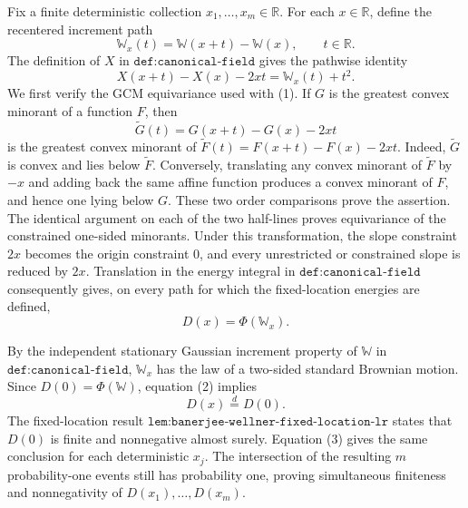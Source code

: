 Fix a finite deterministic collection \(x_1,\ldots,x_m\in\mathbb R\).  For each \(x\in\mathbb R\), define the recentered increment path
\[
 \mathbb W_x(t)=\mathbb W(x+t)-\mathbb W(x),\qquad t\in\mathbb R.
\]
The definition of \(X\) in \(\texttt{def:canonical-field}\) gives the pathwise identity
\[
 X(x+t)-X(x)-2xt=\mathbb W_x(t)+t^2. \tag{1}
\]
We first verify the GCM equivariance used with (1).  If \(G\) is the greatest convex minorant of a function \(F\), then
\[
 \widetilde G(t)=G(x+t)-G(x)-2xt
\]
is the greatest convex minorant of
\(
 \widetilde F(t)=F(x+t)-F(x)-2xt
\).
Indeed, \(\widetilde G\) is convex and lies below \(\widetilde F\).  Conversely, translating any convex minorant of \(\widetilde F\) by \(-x\) and adding back the same affine function produces a convex minorant of \(F\), and hence one lying below \(G\).  These two order comparisons prove the assertion.  The identical argument on each of the two half-lines proves equivariance of the constrained one-sided minorants.  Under this transformation, the slope constraint \(2x\) becomes the origin constraint \(0\), and every unrestricted or constrained slope is reduced by \(2x\).  Translation in the energy integral in \(\texttt{def:canonical-field}\) consequently gives, on every path for which the fixed-location energies are defined,
\[
 D(x)=\Phi(\mathbb W_x). \tag{2}
\]

By the independent stationary Gaussian increment property of \(\mathbb W\) in \(\texttt{def:canonical-field}\), \(\mathbb W_x\) has the law of a two-sided standard Brownian motion.  Since \(D(0)=\Phi(\mathbb W)\), equation (2) implies
\[
 D(x)\stackrel{d}{=}D(0). \tag{3}
\]
The fixed-location result \(\texttt{lem:banerjee-wellner-fixed-location-lr}\) states that \(D(0)\) is finite and nonnegative almost surely.  Equation (3) gives the same conclusion for each deterministic \(x_j\).  The intersection of the resulting \(m\) probability-one events still has probability one, proving simultaneous finiteness and nonnegativity of \(D(x_1),\ldots,D(x_m)\).

